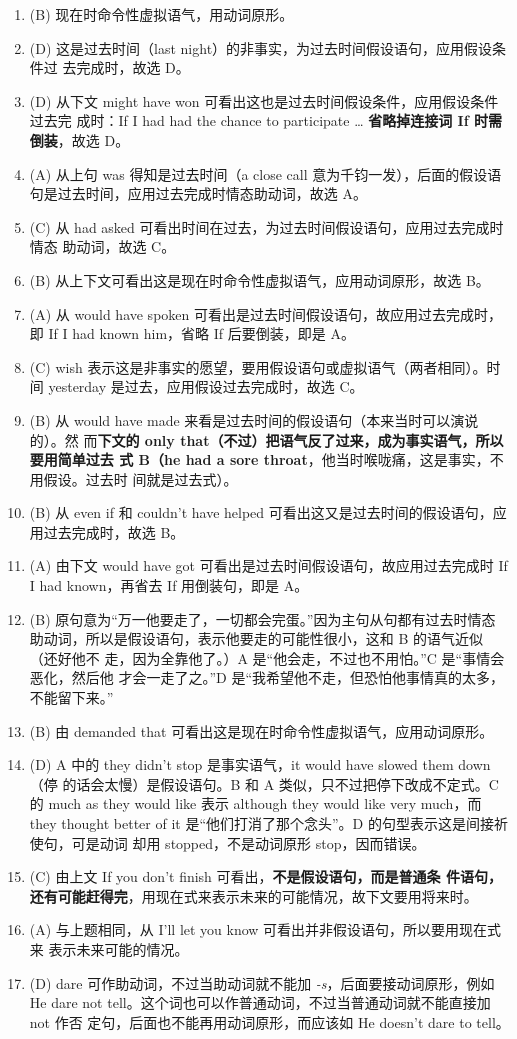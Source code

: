 \begin{enumerate}
\item (B) 现在时命令性虚拟语气，用动词原形。
\item (D) 这是过去时间（last night）的非事实，为过去时间假设语句，应用假设条件过
  去完成时，故选 D。
\item (D) 从下文 might have won 可看出这也是过去时间假设条件，应用假设条件过去完
  成时：If I had had the chance to participate \ldots{} \textbf{省略掉连接词 If 时需
    倒装}，故选 D。
\item (A) 从上句 was 得知是过去时间（a close call 意为千钧一发），后面的假设语
  句是过去时间，应用过去完成时情态助动词，故选 A。
\item (C) 从 had asked 可看出时间在过去，为过去时间假设语句，应用过去完成时情态
  助动词，故选 C。
\item (B) 从上下文可看出这是现在时命令性虚拟语气，应用动词原形，故选 B。
\item (A) 从 would have spoken 可看出是过去时间假设语句，故应用过去完成时，
  即 If I had known him，省略 If 后要倒装，即是 A。
\item (C) wish 表示这是非事实的愿望，要用假设语句或虚拟语气（两者相同）。时
  间 yesterday 是过去，应用假设过去完成时，故选 C。
\item (B) 从 would have made 来看是过去时间的假设语句（本来当时可以演说的）。然
  而\textbf{下文的 only that（不过）把语气反了过来，成为事实语气，所以要用简单过去
    式 B（he had a sore throat}，他当时喉咙痛，这是事实，不用假设。过去时
  间就是过去式）。
\item (B) 从 even if 和 couldn't have helped 可看出这又是过去时间的假设语句，应
  用过去完成时，故选 B。
\item (A) 由下文 would have got 可看出是过去时间假设语句，故应用过去完成时 If I
  had known，再省去 If 用倒装句，即是 A。
\item (B) 原句意为“万一他要走了，一切都会完蛋。”因为主句从句都有过去时情态
  助动词，所以是假设语句，表示他要走的可能性很小，这和 B 的语气近似（还好他不
  走，因为全靠他了。）A 是“他会走，不过也不用怕。”C 是“事情会恶化，然后他
  才会一走了之。”D 是“我希望他不走，但恐怕他事情真的太多，不能留下来。”
\item (B) 由 demanded that 可看出这是现在时命令性虚拟语气，应用动词原形。
\item (D) A 中的 they didn't stop 是事实语气，it would have slowed them down（停
  的话会太慢）是假设语句。B 和 A 类似，只不过把停下改成不定式。C 的 much as
  they would like 表示 although they would like very much，而 they thought
  better of it 是“他们打消了那个念头”。D 的句型表示这是间接祈使句，可是动词
  却用 stopped，不是动词原形 stop，因而错误。
\item (C) 由上文 If you don't finish 可看出，\textbf{不是假设语句，而是普通条
    件语句，还有可能赶得完}，用现在式来表示未来的可能情况，故下文要用将来时。
\item (A) 与上题相同，从 I'll let you know 可看出并非假设语句，所以要用现在式来
  表示未来可能的情况。
\item (D) dare 可作助动词，不过当助动词就不能加 \emph{-s}，后面要接动词原形，例如 He
  dare not tell。这个词也可以作普通动词，不过当普通动词就不能直接加 not 作否
  定句，后面也不能再用动词原形，而应该如 He doesn't dare to tell。


\end{enumerate}
